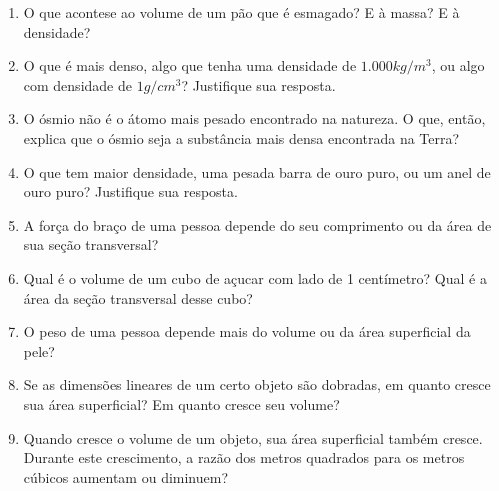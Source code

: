 \begin{enumerate}
    \item O que acontese ao volume de um pão que é esmagado? E à massa? E à densidade?
    \item O que é mais denso, algo que tenha uma densidade de $1.000 kg/m^3$, ou algo com densidade de $1g/cm^3$? Justifique sua resposta.
    \item O ósmio não é o átomo mais pesado encontrado na natureza. O que, então, explica que o ósmio seja a substância mais densa encontrada na Terra?
    \item O que tem maior densidade, uma pesada barra de ouro puro, ou um anel de ouro puro? Justifique sua resposta.
    \item A força do braço de uma pessoa depende do seu comprimento ou da área de sua seção transversal?
    \item Qual é o volume de um cubo de açucar com lado de 1 centímetro? Qual é a área da seção transversal desse cubo?
    \item O peso de uma pessoa depende mais do volume ou da área superficial da pele?
    \item Se as dimensões lineares de um certo objeto são dobradas, em quanto cresce sua área superficial? Em quanto cresce seu volume?
    \item Quando cresce o volume de um objeto, sua área superficial também cresce. Durante este crescimento, a razão dos metros quadrados para os metros cúbicos aumentam ou diminuem?
\end{enumerate}



